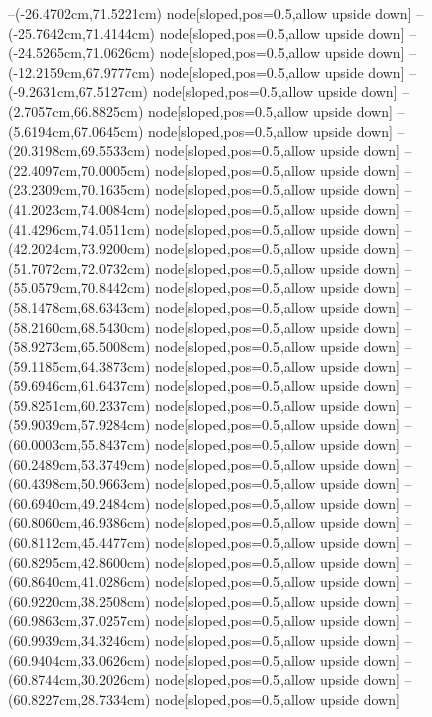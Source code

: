 --(-26.4702cm,71.5221cm) node[sloped,pos=0.5,allow upside down]{\ArrowIn}
--(-25.7642cm,71.4144cm) node[sloped,pos=0.5,allow upside down]{\arrowIn}
--(-24.5265cm,71.0626cm) node[sloped,pos=0.5,allow upside down]{\ArrowIn}
--(-12.2159cm,67.9777cm) node[sloped,pos=0.5,allow upside down]{\ArrowIn}
--(-9.2631cm,67.5127cm) node[sloped,pos=0.5,allow upside down]{\ArrowIn}
--(2.7057cm,66.8825cm) node[sloped,pos=0.5,allow upside down]{\ArrowIn}
--(5.6194cm,67.0645cm) node[sloped,pos=0.5,allow upside down]{\ArrowIn}
--(20.3198cm,69.5533cm) node[sloped,pos=0.5,allow upside down]{\ArrowIn}
--(22.4097cm,70.0005cm) node[sloped,pos=0.5,allow upside down]{\ArrowIn}
--(23.2309cm,70.1635cm) node[sloped,pos=0.5,allow upside down]{\arrowIn}
--(41.2023cm,74.0084cm) node[sloped,pos=0.5,allow upside down]{\ArrowIn}
--(41.4296cm,74.0511cm) node[sloped,pos=0.5,allow upside down]{\arrowIn}
--(42.2024cm,73.9200cm) node[sloped,pos=0.5,allow upside down]{\arrowIn}
--(51.7072cm,72.0732cm) node[sloped,pos=0.5,allow upside down]{\ArrowIn}
--(55.0579cm,70.8442cm) node[sloped,pos=0.5,allow upside down]{\ArrowIn}
--(58.1478cm,68.6343cm) node[sloped,pos=0.5,allow upside down]{\ArrowIn}
--(58.2160cm,68.5430cm) node[sloped,pos=0.5,allow upside down]{\arrowIn}
--(58.9273cm,65.5008cm) node[sloped,pos=0.5,allow upside down]{\ArrowIn}
--(59.1185cm,64.3873cm) node[sloped,pos=0.5,allow upside down]{\ArrowIn}
--(59.6946cm,61.6437cm) node[sloped,pos=0.5,allow upside down]{\ArrowIn}
--(59.8251cm,60.2337cm) node[sloped,pos=0.5,allow upside down]{\ArrowIn}
--(59.9039cm,57.9284cm) node[sloped,pos=0.5,allow upside down]{\ArrowIn}
--(60.0003cm,55.8437cm) node[sloped,pos=0.5,allow upside down]{\ArrowIn}
--(60.2489cm,53.3749cm) node[sloped,pos=0.5,allow upside down]{\ArrowIn}
--(60.4398cm,50.9663cm) node[sloped,pos=0.5,allow upside down]{\ArrowIn}
--(60.6940cm,49.2484cm) node[sloped,pos=0.5,allow upside down]{\ArrowIn}
--(60.8060cm,46.9386cm) node[sloped,pos=0.5,allow upside down]{\ArrowIn}
--(60.8112cm,45.4477cm) node[sloped,pos=0.5,allow upside down]{\ArrowIn}
--(60.8295cm,42.8600cm) node[sloped,pos=0.5,allow upside down]{\ArrowIn}
--(60.8640cm,41.0286cm) node[sloped,pos=0.5,allow upside down]{\ArrowIn}
--(60.9220cm,38.2508cm) node[sloped,pos=0.5,allow upside down]{\ArrowIn}
--(60.9863cm,37.0257cm) node[sloped,pos=0.5,allow upside down]{\ArrowIn}
--(60.9939cm,34.3246cm) node[sloped,pos=0.5,allow upside down]{\ArrowIn}
--(60.9404cm,33.0626cm) node[sloped,pos=0.5,allow upside down]{\ArrowIn}
--(60.8744cm,30.2026cm) node[sloped,pos=0.5,allow upside down]{\ArrowIn}
--(60.8227cm,28.7334cm) node[sloped,pos=0.5,allow upside down]{\ArrowIn}
